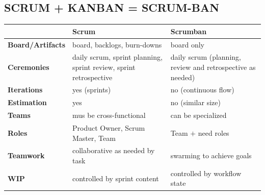 \documentclass[a4paper]{article}
\begin{document}
    \subsection{SCRUM + KANBAN = SCRUM-BAN}

    \begin{table}[H]
        \begin{center}
            \begin{tabular}{| p{3cm} | p{6cm} p{6cm} |}
                \toprule
                & \textbf{Scrum} & \textbf{Scrumban}\\
                \toprule

                \cmidrule(r){1-1}\cmidrule(rl){2-2}\cmidrule(l){3-3}
                \textbf{Board/Artifacts} & board, backlogs, burn-downs & board only\\

                \cmidrule(r){1-1}\cmidrule(rl){2-2}\cmidrule(l){3-3}
                \textbf{Ceremonies} & daily scrum, sprint planning, sprint review, sprint retrospective
                & daily scrum (planning, review and retrospective as needed)\\

                \cmidrule(r){1-1}\cmidrule(rl){2-2}\cmidrule(l){3-3}
                \textbf{Iterations} & yes (sprints) & no (continuous flow)\\

                \cmidrule(r){1-1}\cmidrule(rl){2-2}\cmidrule(l){3-3}
                \textbf{Estimation} & yes & no (similar size)\\

                \cmidrule(r){1-1}\cmidrule(rl){2-2}\cmidrule(l){3-3}
                \textbf{Teams} & mus be cross-functional & can be specialized\\

                \cmidrule(r){1-1}\cmidrule(rl){2-2}\cmidrule(l){3-3}
                \textbf{Roles} & Product Owner, Scrum Master, Team & Team $+$ need roles\\

                \cmidrule(r){1-1}\cmidrule(rl){2-2}\cmidrule(l){3-3}
                \textbf{Teamwork} & collaborative as needed by task & swarming to achieve goals\\

                \cmidrule(r){1-1}\cmidrule(rl){2-2}\cmidrule(l){3-3}
                \textbf{WIP} & controlled by sprint content & controlled by workflow state\\


\end{tabular}
\end{center}
\end{table}
\end{document}
